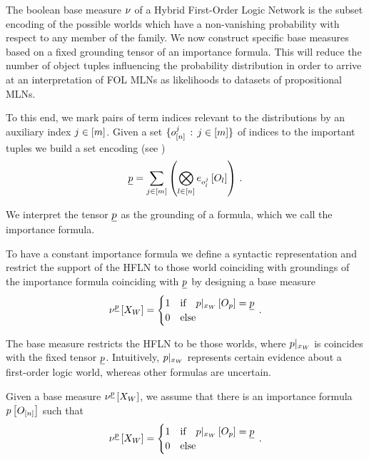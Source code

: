 
The boolean base measure $\nu$ of a Hybrid First-Order Logic Network is the subset encoding of the possible worlds which have a non-vanishing probability with respect to any member of the family.
We now construct specific base measures based on a fixed grounding tensor of an importance formula.
This will reduce the number of object tuples influencing the probability distribution in order to arrive at an interpretation of FOL MLNs as likelihoods to datasets of propositional MLNs.

To this end, we mark pairs of term indices relevant to the distributions by an auxiliary index $j\in[m]$.
Given a set $\{o_{[n]}^{j} \, : \, j\in[m] \}$ of indices to the important tuples we build a set encoding (see )
\begin{align*}
    \underline{p} = \sum_{j\in[m]} \left(
    \bigotimes_{l\in[n]} e_{o_{l}^{j}}\left[O_{l}\right]
    \right) \, .
\end{align*}

We interpret the tensor $\underline{p}$ as the grounding of a formula, which we call the importance formula.

To have a constant importance formula we define a syntactic representation and restrict the support of the HFLN to those world coinciding with groundings of the importance formula coinciding with $\underline{p}$ by designing a base measure
\begin{align*}
    \nu^{\underline{p}}\left[X_{W}\right]
    = \begin{cases}
          1 & \text{if} \quad {p}|_{x_{W}} \left[O_{p}\right] = \underline{p} \\
          0 & \text{else}
    \end{cases} \, .
\end{align*}

The base measure restricts the HFLN to be those worlds, where ${p}|_{x_{W}}$ is coincides with the fixed tensor $\underline{p}$.
Intuitively, ${p}|_{x_{W}}$ represents certain evidence about a first-order logic world, whereas other formulas are uncertain.


\begin{assumption}
    \label{ass:importanceBasemeasure}
    Given a base measure $\nu^{\underline{p}}\left[X_{W}\right]$, we assume that there is an importance formula $p\left[O_{[n]}\right]$ such that
    \begin{align*}
        \nu^{\underline{p}}\left[X_{W}\right]
        = \begin{cases}
              1 & \text{if} \quad {p}|_{x_{W}} \left[O_{p}\right] = \underline{p} \\
              0 & \text{else}
        \end{cases} \, .
    \end{align*}
\end{assumption}


